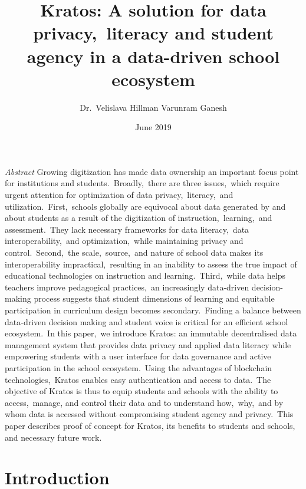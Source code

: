 \documentclass{article}
\title{Kratos: A solution for data privacy,\ literacy and student agency in a data-driven school ecosystem}
\author{Dr.\ Velislava Hillman \quad Varunram Ganesh}
\date{June 2019}
\begin{document}
\maketitle

\textit{Abstract}
Growing digitization has made data ownership an important focus point for institutions and students.\ Broadly,\ there are three issues,\ which require urgent attention for optimization of data privacy,\ literacy,\ and utilization.\ First,\ schools globally are equivocal about data generated by and about students as a result of the digitization of instruction,\ learning,\ and assessment.\ They lack necessary frameworks for data literacy,\ data interoperability,\ and optimization,\ while maintaining privacy and control.\ Second,\ the scale,\ source,\ and nature of school data makes its interoperability impractical,\ resulting in an inability to assess the true impact of educational technologies on instruction and learning.\ Third,\ while data helps teachers improve pedagogical practices,\ an increasingly data-driven decision-making process suggests that student dimensions of learning and equitable participation in curriculum design becomes secondary.\ Finding a balance between data-driven decision making and student voice is critical for an efficient school ecosystem.\ In this paper,\ we introduce Kratos: an immutable decentralised data management system that provides data privacy and applied data literacy while empowering students with a user interface for data governance and active participation in the school ecosystem.\ Using the advantages of blockchain technologies,\ Kratos enables easy authentication and access to data.\ The objective of Kratos is thus to equip students and schools with the ability to access,\ manage, and control their data and to understand how,\ why,\ and by whom data is accessed without compromising student agency and privacy.\ This paper describes proof of concept for Kratos, its benefits to students and schools, and necessary future work.
\bigbreak
\newpage
\section{Introduction}
\end{document}
